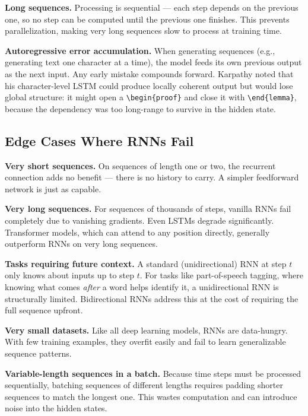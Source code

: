 \documentclass[12pt,a4paper]{article}
\begin{document}
\textbf{Long sequences.}
Processing is sequential --- each step depends on the previous one, so no step can be
computed until the previous one finishes. This prevents parallelization, making very
long sequences slow to process at training time.

\textbf{Autoregressive error accumulation.}
When generating sequences (e.g., generating text one character at a time), the model
feeds its own previous output as the next input. Any early mistake compounds forward.
Karpathy noted that his character-level LSTM could produce locally coherent output but
would lose global structure: it might open a \verb|\begin{proof}| and close it with
\verb|\end{lemma}|, because the dependency was too long-range to survive in the hidden
state.

\subsection{Edge Cases Where RNNs Fail}

\textbf{Very short sequences.}
On sequences of length one or two, the recurrent connection adds no benefit --- there
is no history to carry. A simpler feedforward network is just as capable.

\textbf{Very long sequences.}
For sequences of thousands of steps, vanilla RNNs fail completely due to vanishing
gradients. Even LSTMs degrade significantly. Transformer models, which can attend to
any position directly, generally outperform RNNs on very long sequences.

\textbf{Tasks requiring future context.}
A standard (unidirectional) RNN at step $t$ only knows about inputs up to step $t$.
For tasks like part-of-speech tagging, where knowing what comes \textit{after} a word
helps identify it, a unidirectional RNN is structurally limited. Bidirectional RNNs
address this at the cost of requiring the full sequence upfront.

\textbf{Very small datasets.}
Like all deep learning models, RNNs are data-hungry. With few training examples, they
overfit easily and fail to learn generalizable sequence patterns.

\textbf{Variable-length sequences in a batch.}
Because time steps must be processed sequentially, batching sequences of different
lengths requires padding shorter sequences to match the longest one. This wastes
computation and can introduce noise into the hidden states.
\end{document}
